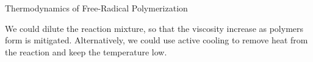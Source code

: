 \begin{activity}{Thermodynamics of Free-Radical Polymerization}
\begin{ctqs}
		\begin{solution}[2in]{}
			We could dilute the reaction mixture, so that the viscosity increase as polymers form is mitigated.  Alternatively, we could use active cooling to remove heat from the reaction and keep the temperature low.
		\end{solution}

\end{ctqs}


	


%
%	


	
\end{activity}